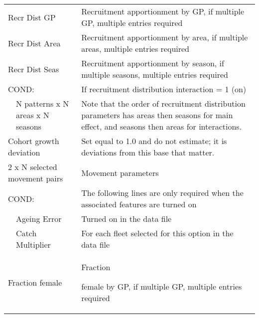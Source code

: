 \begin{center}
\begin{longtable}{p{1cm} p{2.5cm} p{10cm}}
		\hline
		\multicolumn{2}{l}{Recr Dist GP} & Recruitment apportionment by GP, if multiple GP, multiple entries required\\
		\multicolumn{2}{l}{Recr Dist Area} & Recruitment apportionment by area, if multiple areas, multiple entries required\\
		\multicolumn{2}{l}{Recr Dist Seas} & Recruitment apportionment by season, if multiple seasons, multiple entries required\\
		\hline
		\multicolumn{2}{l}{COND:} & If recruitment distribution interaction = 1 (on)\\
		& N patterns x N areas x N seasons & Note that the order of recruitment distribution parameters has areas then seasons for main effect, and seasons then areas for interactions.\\
		\hline
		\multicolumn{2}{l}{Cohort growth deviation} & Set equal to 1.0 and do not estimate; it is deviations from this base that matter.\\
		\hline
		\multicolumn{2}{l}{2 x N selected movement pairs} & Movement parameters\\
		\hline
		\multicolumn{2}{l}{COND:} & The following lines are only required when the associated features are turned on\\
		& Ageing Error & Turned on in the data file\\
		& Catch Multiplier & For each fleet selected for this option in the data file\\
		\hline
		\multicolumn{2}{l}{Fraction female} & \hypertarget{SexRatio}{Fraction} female by GP, if multiple GP, multiple entries required\\
		\hline
	\end{longtable}
\end{center}

